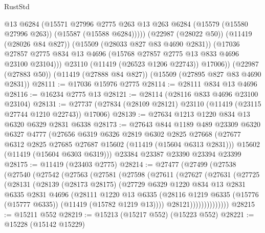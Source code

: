 \begin{lexlean}{RustStd}
\begin{coremodule}
              @13
              @6284
              (@15571
                @27996
                @2775
                @263
                @13
                @263
                @6284
                (@15579 (@15580 @27996 @263))
                (@15587 (@15588 @6284)))))
          (@22987 (@28022 @50))
          (@11419 (@28026 @84 @827))
          (@15509 (@28033 @827 @83 @4690 @2831))
          (@17036 @27857 @2775 @834 @13 @4696 (@15768 @27857 @2775 @13 @833 @4696 @23100 @23104)))
        @23110
        (@11419 (@26523 @1206 @22743))
        @17006))
    (@22987 (@27883 @50))
    (@11419 (@27888 @84 @827))
    (@15509 (@27895 @827 @83 @4690 @2831))
@28111 := @17036 @15976 @2775
@28114 := @28111 @834 @13 @4696
@28116 := @16234 @2775 @13
@28121 := @28114 (@28116 @833 @4696 @23100 @23104)
@28131 := @27737 (@27834 (@28109 @28121) @23110 (@11419 (@23115 @27744 @1210 @22743)) @17006)
@28139 := @27634 @1213 @1220 @834 @13 @6320 @6329 @2831 @6338
@28173 := @27643
    @844
    @1189
    @489
    @23309
    @6320
    @6327
    @4777
    (@27656
      @6319
      @6326
      @2819
      @6302
      @2825
      @27668
      (@27677 @6312 @2825 @27685 @27687 @15602 (@11419 (@15604 @6313 @2831)))
      @15602
      (@11419 (@15604 @6303 @6319)))
    @23384
    @23387
    @23390
    @23394
    @23399
@28175 := @11419 (@23403 @2775)
@28214 := @27477
    (@27499
      (@27538
        (@27540
          (@27542
            (@27563
              (@27581
                (@27598
                  (@27611
                    (@27627
                      (@27631
                        (@27725
                          (@28131
                            (@28139
                              (@28173 @28175)
                              (@27729
                                @6329
                                @1220
                                @834
                                @13
                                @2831
                                @6335
                                @2831
                                @4696
                                (@28111
                                  @1220
                                  @13
                                  @6335
                                  (@28116
                                    @1219
                                    @6335
                                    (@15776 (@15777 @6335))
                                    (@11419 (@15782 @1219 @13))))
                                @28121))))))))))))))
@28215 := @15211 @552
@28219 := @15213 (@15217 @552) (@15223 @552)
@28221 := @15228 (@15142 @15229)

\end{coremodule}
\end{lexlean}
